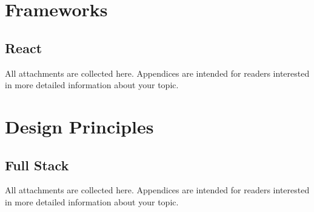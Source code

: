\chapter{Frameworks}
\section{React}
All attachments are collected here. Appendices are intended for readers interested in more detailed information about your topic.

\chapter{Design Principles}
\section{Full Stack}
All attachments are collected here. Appendices are intended for readers interested in more detailed information about your topic.